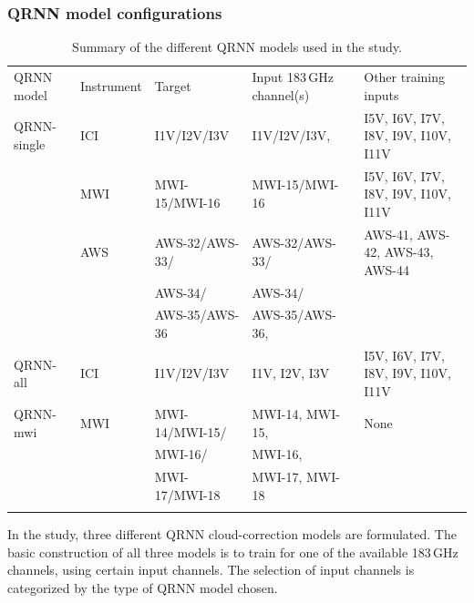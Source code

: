 \documentclass[amt, manuscript]{copernicus}
\begin{document}

\subsubsection{ QRNN model configurations}
%
\label{QRNN_models}

\begin{table}[t]
	\caption{Summary of the different QRNN models used in the study.}
	\label{tab:QRNN_models}
	\begin{tabular}{lllll}
		\tophline
		QRNN model & Instrument & Target & Input 183\,GHz channel(s) &Other training inputs \\
		\middlehline
		QRNN-single &  ICI 	& I1V/I2V/I3V 	& I1V/I2V/I3V, & I5V, I6V, I7V, I8V, I9V, I10V, I11V\\
		\cline{2-5}
		&  MWI 	& MWI-15/MWI-16 & MWI-15/MWI-16	& I5V, I6V, I7V, I8V, I9V, I10V, I11V \\
		\cline{2-5}
		& AWS	& AWS-32/AWS-33/ &  AWS-32/AWS-33/ & AWS-41, AWS-42, AWS-43, AWS-44\\
		&		& AWS-34/		 &	AWS-34/		   & \\
		&		& AWS-35/AWS-36	 & AWS-35/AWS-36,  &\\
		\cline{1-5}
		QRNN-all &  ICI 	& I1V/I2V/I3V 	& I1V, I2V, I3V & I5V, I6V, I7V, I8V, I9V, I10V, I11V\\
		\cline{1-5}
		QRNN-mwi &  MWI		& MWI-14/MWI-15/ &  MWI-14, MWI-15, & None 	\\	
		&			& MWI-16/		 &  MWI-16, & \\
		&			& MWI-17/MWI-18	 &  MWI-17, MWI-18  &\\					
		\bottomhline
	\end{tabular}
	\belowtable{} %
\end{table}						

In the study, three different QRNN cloud-correction models are formulated. The basic construction of all three models is to train for one of the available 183\,GHz channels, using certain input channels. The selection of input channels is categorized by the type of QRNN model chosen.
\end{document}
